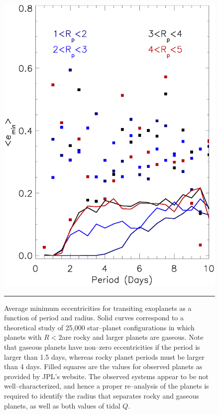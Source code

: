 \begin{figure}[t] 
  \begin{minipage}[c]{0.39\textwidth}
    \includegraphics[width=\textwidth]{figures/compare.emin.ps}
  \end{minipage}\hfill
  \begin{minipage}[c]{0.6\textwidth}
    \caption{Average minimum eccentricities for transiting
  exoplanets as a function of period and radius.  Solid curves
  correspond to a theoretical study of 25,000 star--planet
  configurations in which planets with $R < 2$\rearth are rocky and
  larger planets are gaseous.  Note that gaseous planets have
  non--zero eccentricities if the period is larger than 1.5 days,
  whereas rocky planet periods must be larger than 4 days.  Filled
  squares are the values for observed \kepler planets as provided by
  JPL's \kepler website.  The observed systems appear to be not
  well--characterized, and hence a proper re--analysis of the
  \kepler planets is required to identify the radius that separates
  rocky and gaseous planets, as well as both values of tidal $Q$.}
    \label{fig:emin}
    \hspace*{\fill}  
    \hrule
  \end{minipage}
\end{figure}

